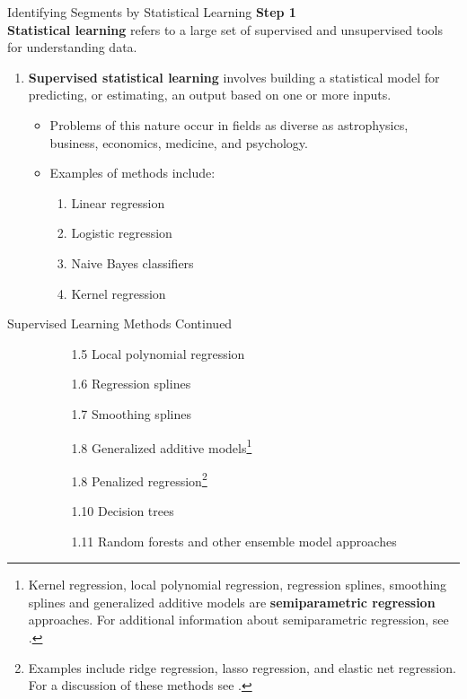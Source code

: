 \documentclass[pdf]{beamer}
\newcommand{\empr}[1]{{\color{franklinblue}\textbf{#1}}}
\theoremstyle{remark}
\theoremstyle{definition}
\begin{document}
\begin{frame}[t]{Identifying Segments by Statistical Learning}
\textbf{\color{franklinblue} Step 1} \\
\vspace{1.5ex}
\empr{Statistical learning} refers to a large set of supervised and unsupervised tools for understanding data. 
\begin{enumerate}
\item \empr{Supervised statistical learning} involves building a statistical model for predicting, or estimating, an output based on one or more inputs. 
\begin{itemize}
\item Problems of this nature occur in fields as diverse as astrophysics, business, economics, medicine, and psychology. 
\item Examples of methods include:
\begin{enumerate}
  \item Linear regression
  \item Logistic regression
  \item Naive Bayes classifiers 
  \item Kernel regression
\end{enumerate}
\end{itemize}
\end{enumerate}
\end{frame}

\begin{frame}[t]{Supervised Learning Methods Continued}
\begin{enumerate}
\item []
\begin{itemize}
\item []
\begin{enumerate}
\item [1.5] Local polynomial regression
\item [1.6] Regression splines
\item [1.7]  Smoothing splines 
\item [1.8] Generalized additive models\footnote{Kernel regression, local polynomial regression, regression splines, smoothing splines and generalized additive models are \empr{semiparametric regression} approaches.  For additional information about semiparametric regression, see \cite{rupert2009}.} 
\item [1.8] Penalized regression\footnote{Examples include ridge regression, lasso regression, and elastic net regression.  For a discussion of these methods see \cite{zou2005}.}
\item [1.10] Decision trees
\item [1.11] Random forests and other ensemble model approaches
\end{enumerate}
\end{itemize}
\end{enumerate}
\end{frame}
\end{document}
